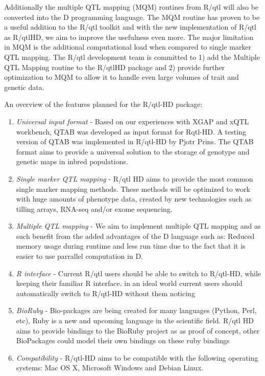 Additionally the multiple QTL mapping (MQM) routines from R/qtl will also be converted into the D programming language.
The MQM routine has proven to be a useful addition to the R/qtl toolkit and with the new implementation of R/qtl as 
R/qtlHD, we aim to improve the usefulness even more. The major limitation in MQM is the additional computational 
load when compared to single marker QTL mapping. The R/qtl development team is committed to 1) add the Multiple QTL 
Mapping routine to the R/qtlHD package and 2) provide further optimization to MQM to allow it to handle even large 
volumes of trait and genetic data.

An overview of the features planned for the R/qtl-HD package:
\begin{enumerate}\itemsep1pt
\item \emph{Universal input format} - Based on our experiences with XGAP and xQTL workbench, QTAB was developed as input 
                                      format for Rqtl-HD. A testing version of QTAB was implemented in R/qtl-HD by Pjotr 
                                      Prins. The QTAB format aims to provide a universal solution to the storage of genotype 
                                      and genetic maps in inbred populations.
\item \emph{Single marker QTL mapping} - R/qtl HD aims to provide the most common single marker mapping methods. These methods 
                                         will be optimized to work with huge amounts of phenotype data, created by new technologies 
                                         such as tilling arrays, RNA-seq and/or exome sequencing.
\item \emph{Multiple QTL mapping} - We aim to implement multiple QTL mapping and as such benefit from the added advantages of the D 
                                    language such as: Reduced memory usage during runtime and less run time due to the fact that 
                                    it is easier to use parrallel computation in D.
\item \emph{R interface} - Current R/qtl users should be able to switch to R/qtl-HD, while keeping their familiar R interface. in 
                           an ideal world current users should automatically switch to R/qtl-HD without them noticing
\item \emph{BioRuby} - Bio-packages are being created for many languages (Python, Perl, etc), Ruby is a new and upcoming language in the 
                       scientific field. R/qtl HD aims to provide bindings to the BioRuby project as as proof of concept, other BioPackages 
                       could model their own bindings on these ruby bindings
\item \emph{Compatibility} - R/qtl-HD aims to be compatible with the following operating systems: Mac OS X, Microsoft Windows and Debian Linux.
\end{enumerate}


